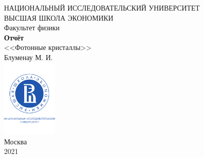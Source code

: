 \documentclass[a4paper, 12pt]{article}
\begin{document}
	\begin{titlepage}
		\begin{center}
			$$$$
			$$$$
			$$$$
			$$$$
			{\Large{НАЦИОНАЛЬНЫЙ ИССЛЕДОВАТЕЛЬСКИЙ УНИВЕРСИТЕТ}}\\
			\vspace{0.1cm}
			{\Large{ВЫСШАЯ ШКОЛА ЭКОНОМИКИ}}\\
			\vspace{0.25cm}
			{\large{Факультет физики}}\\
			\vspace{5.5cm}
			{\Huge\textbf{{Отчёт}}}\\%
			\vspace{1cm}
			{\LARGE{<<Фотонные кристаллы>>}}\\%
			\vspace{1cm}
			{\LARGE{Блуменау М. И.}}\\%
			\vspace{2cm}
			\vfill
			\includegraphics[width = 0.2\textwidth]{HSElogo}\\
			\vfill
			Москва\\
			2021
		\end{center}
	\end{titlepage}
	
	\tableofcontents
	\newpage
\end{document}
